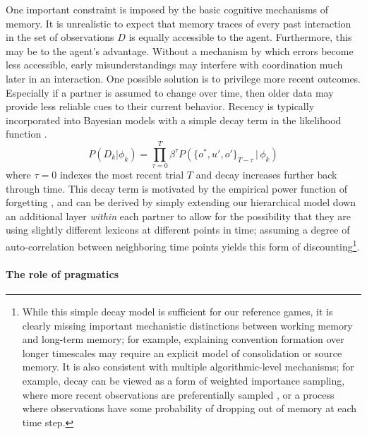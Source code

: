One important constraint is imposed by the basic cognitive mechanisms of memory.
It is unrealistic to expect that memory traces of every past interaction in the set of observations $D$ is equally accessible to the agent.
Furthermore, this may be to the agent's advantage.
Without a mechanism by which errors become less accessible, early misunderstandings may interfere with coordination much later in an interaction. 
One possible solution is to privilege more recent outcomes. 
Especially if a partner is assumed to change over time, then older data may provide less reliable cues to their current behavior.
Recency is typically incorporated into Bayesian models with a simple decay term in the likelihood function \cite{anderson2000adaptive,angela2009sequential,fudenberg2014recency,kalm2018visual}.
$$P(D_k | \phi_k) = \prod_{\tau=0}^T \beta^{\tau} P(\{o^*,u',o'\}_{T-\tau}\, |\, \phi_k)$$
where $\tau=0$ indexes the most recent trial $T$ and decay increases further back through time.
This decay term is motivated by the empirical power function of forgetting \cite{wixted1991form}, and can be derived by simply extending our hierarchical model down an additional layer \emph{within} each partner to allow for the possibility that they are using slightly different lexicons at different points in time; assuming a degree of auto-correlation between neighboring time points yields this form of discounting\footnote{While this simple decay model is sufficient for our reference games, it is clearly missing important mechanistic distinctions between working memory and long-term memory; for example, explaining convention formation over longer timescales may require an explicit model of consolidation or source memory. It is also consistent with multiple algorithmic-level mechanisms; for example, decay can be viewed as a form of weighted importance sampling, where more recent observations are preferentially sampled \cite{pearl2010online}, or a process where observations have some probability of dropping out of memory at each time step.}.


\paragraph{The role of pragmatics}

